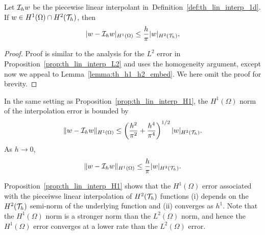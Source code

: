 \begin{proposition}
  \label{prop:th_lin_interp_H1}
    Let $\mathcal{I}_h w$ be the piecewise linear interpolant in~Definition~\ref{def:th_lin_interp_1d}. If $w \in H^1(\Omega) \cap H^2(\mathcal{T}_h)$, then
  \begin{equation*}
    | w - \mathcal{I}_h w |_{H^1(\Omega)}
    \leq \frac{h}{\pi} | w |_{H^2(\mathcal{T}_h)},
  \end{equation*}
  \begin{proof}
    Proof is similar to the analysis for the $L^2$ error in Proposition~\ref{prop:th_lin_interp_L2} and uses the homogeneity argument, except now we appeal to Lemma~\ref{lemma:th_h1_h2_embed}. We here omit the proof for brevity.
  \end{proof}
\end{proposition}
\begin{corollary}
  In the same setting as Proposition~\ref{prop:th_lin_interp_H1}, the $H^1(\Omega)$ norm of the interpolation error is bounded by
  \begin{equation*}
    \|w - \mathcal{I}_h w \|_{H^1(\Omega)} \leq  \left(  \frac{h^2}{\pi^2} +  \frac{h^4}{\pi^4} \right)^{1/2} | w |_{H^2(\mathcal{T}_h)}.
  \end{equation*}
  As $h \to 0$, 
  \begin{equation*}
    \|w - \mathcal{I}_h w \|_{H^1(\Omega)} \leq  \frac{h}{\pi}  | w |_{H^2(\mathcal{T}_h)}.
  \end{equation*}
\end{corollary}
Proposition~\ref{prop:th_lin_interp_H1} shows that the $H^1(\Omega)$ error associated with the pieceiwse linear interpolation of $H^2(\mathcal{T}_h)$ functions (i) depends on the $H^2(\mathcal{T}_h)$ semi-norm of the underlying function and (ii) converges as $h^1$. Note that the $H^1(\Omega)$ norm is a stronger norm than the $L^2(\Omega)$ norm, and hence the $H^1(\Omega)$ error converges at a lower rate than the $L^2(\Omega)$ error.


